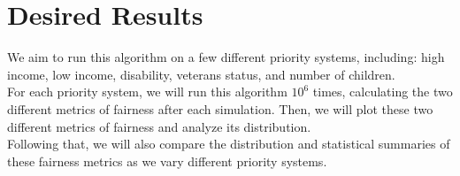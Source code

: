 \documentclass[11pt]{article}
\begin{document}
\section{Desired Results}
We aim to run this algorithm on a few different priority systems, including: high income, low income, disability, veterans status, and number of children. \\
\newline
For each priority system, we will run this algorithm $10^6$ times, calculating the two different metrics of fairness after each simulation. Then, we will plot these two different metrics of fairness and analyze its distribution. \\
\newline
Following that, we will also compare the distribution and statistical summaries of these fairness metrics as we vary different priority systems.
\end{document}
